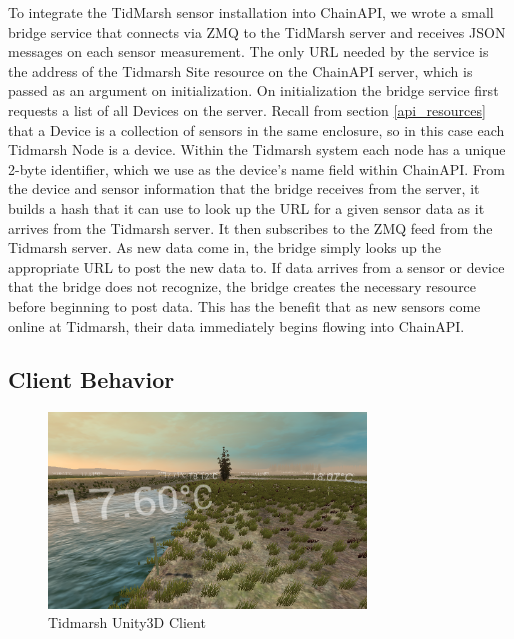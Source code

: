 \documentclass{acm_proc_article-sp}
\begin{document}
To integrate the TidMarsh sensor installation into ChainAPI, we wrote a small
bridge service that connects via ZMQ to the TidMarsh server and receives JSON
messages on each sensor measurement. The only URL needed by the service
is the address of the Tidmarsh Site resource on the ChainAPI server, which is
passed as an argument on initialization. On initialization the bridge service
first requests a list of all Devices on the server. Recall from section
\ref{api_resources} that a Device is a collection of sensors in the same
enclosure, so in this case each Tidmarsh Node is a device. Within the Tidmarsh
system each node has a unique 2-byte identifier, which we use as the device's
name field within ChainAPI. From the device and sensor information that the
bridge receives from the server, it builds a hash that it can use to look up
the URL for a given sensor data as it arrives from the Tidmarsh server. It then
subscribes to the ZMQ feed from the Tidmarsh server. As new data come in, the
bridge simply looks up the appropriate URL to post the new data to. If data
arrives from a sensor or device that the bridge does not recognize, the bridge
creates the necessary resource before beginning to post data. This has the
benefit that as new sensors come online at Tidmarsh, their data immediately
begins flowing into ChainAPI.

\subsection{Client Behavior}

\begin{figure}
    \centering
    \includegraphics[width=8.45cm]{tidmarsh_screenshot}
    \caption{Tidmarsh Unity3D Client}
    \label{tidmarsh_screenshot}
\end{figure}
\end{document}
